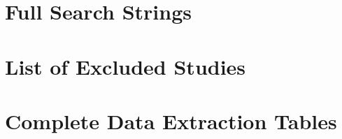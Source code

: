 \section{Full Search Strings}\label{app:search-strings}


\section{List of Excluded Studies}\label{app:excluded}


\section{Complete Data Extraction Tables}\label{app:extraction}



